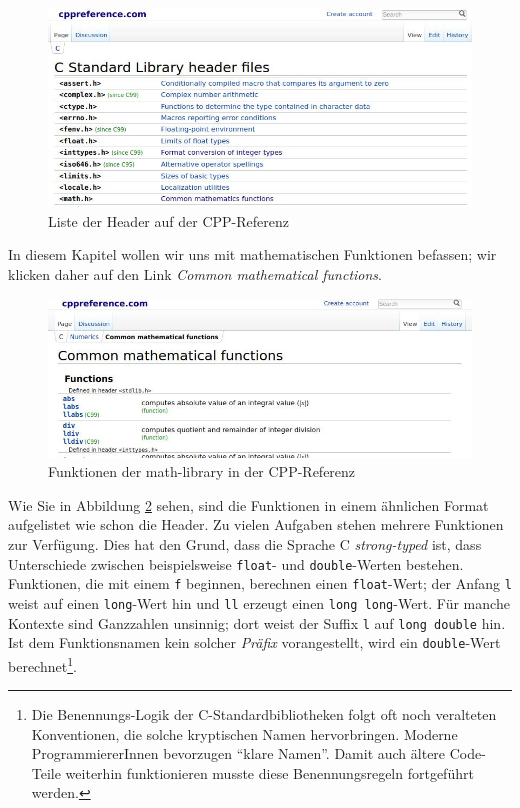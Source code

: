 \begin{figure}[h!]
	\includegraphics[width=\linewidth]{./gfx/cpp-headers}
	\caption{Liste der Header auf der CPP-Referenz} \label{fig:cpp-headers}
\end{figure}

In diesem Kapitel wollen wir uns mit mathematischen Funktionen befassen; wir klicken daher auf den Link \emph{Common mathematical functions}.

\begin{figure}[h!]
	\includegraphics[width=\linewidth]{./gfx/cpp-math}
	\caption{Funktionen der math-library in der CPP-Referenz} \label{fig:cpp-math}
\end{figure}

Wie Sie in Abbildung \ref{fig:cpp-math} sehen, sind die Funktionen in einem ähnlichen Format aufgelistet wie schon die Header. Zu vielen Aufgaben stehen mehrere Funktionen zur Verfügung. Dies hat den Grund, dass die Sprache C \emph{strong-typed} ist, \ie dass Unterschiede zwischen beispielsweise \texttt{float}- und \texttt{double}-Werten bestehen. Funktionen, die mit einem \texttt{f} beginnen, berechnen \idR einen \texttt{float}-Wert; der Anfang \texttt{l} weist auf einen \texttt{long}-Wert hin und \texttt{ll} erzeugt einen \texttt{long long}-Wert. Für manche Kontexte sind Ganzzahlen unsinnig; dort weist der Suffix \texttt{l} auf \texttt{long double} hin. Ist dem Funktionsnamen kein solcher \emph{Präfix} vorangestellt, wird ein \texttt{double}-Wert berechnet\footnote{Die Benennungs-Logik der C-Standardbibliotheken folgt oft noch veralteten Konventionen, die solche kryptischen Namen hervorbringen. Moderne ProgrammiererInnen bevorzugen \enquote{klare Namen}. Damit auch ältere Code-Teile weiterhin funktionieren musste diese Benennungsregeln fortgeführt werden.}.

